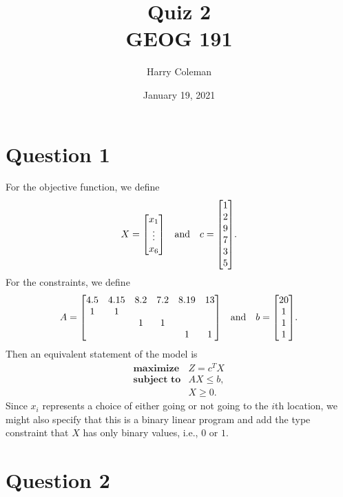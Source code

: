\documentclass[12pt]{article}
\title{Quiz 2\\
    \large GEOG 191
}
\author{Harry Coleman}
\date{January 19, 2021}
\theoremstyle{definition}
\newcommand{\isp}[1]{\quad\text{#1}\quad}
\begin{document}
\maketitle

\section*{Question 1}

For the objective function, we define
\[
    X = \mqty[x_1 \\ \vdots \\ x_6] \isp{and} c = \mqty[1 \\ 2 \\ 9 \\ 7 \\ 3 \\ 5].
\]
For the constraints, we define
\[
    A = \mqty[
        4.5 & 4.15 & 8.2 & 7.2 & 8.19 & 13 \\
        1 & 1 &  &  &  &  \\
         &  & 1 & 1 &  &  \\
         &  &   &   & 1 & 1
    ]
    \isp{and}
    b = \mqty[20 \\ 1 \\ 1 \\ 1].
\]
Then an equivalent statement of the model is
\[
    \begin{array}{ll}
        \textbf{maximize}   & Z = c^T X \\
        \textbf{subject to} & AX \leq b, \\
                            & X \geq 0.
    \end{array}
\]
Since $x_i$ represents a choice of either going or not going to the $i$th location, we might also specify that this is a binary linear program and add the type constraint that $X$ has only binary values, i.e., $0$ or $1$.

\newpage
\section*{Question 2}
\end{document}
